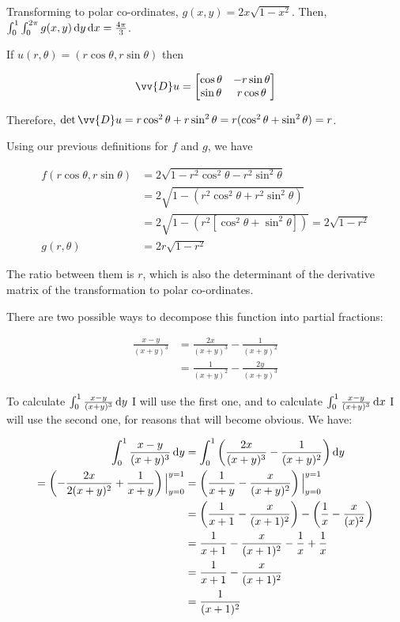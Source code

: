 Transforming to polar co-ordinates, $g(x, y) = 2x\sqrt{1 - x^2}$. Then, $\int_0^1 \int_0^{2\pi} g(x, y) \mathop{}\!\mathrm{d} y \mathop{}\!\mathrm{d} x = \frac{4\pi}{3}$.

If $u(r, \theta) = (r\cos\theta, r\sin\theta)$ then

$$
\vv{D}u =
\begin{bmatrix}
  \cos\theta & -r\sin\theta \\
  \sin\theta & r\cos\theta
\end{bmatrix}
$$

Therefore, $\detm \vv{D}u = r\cos^2\theta + r\sin^2\theta = r(\cos^2\theta + \sin^2\theta) = r$.

Using our previous definitions for $f$ and $g$, we have

\begin{align*}
  f(r\cos\theta, r\sin\theta) &= 2\sqrt{1 - r^2\cos^2\theta - r^2\sin^2\theta} \\
  &= 2\sqrt{1 - (r^2\cos^2\theta + r^2\sin^2\theta)} \\
  &= 2\sqrt{1 - (r^2[\cos^2\theta + \sin^2\theta])}  = 2\sqrt{1 - r^2} \\
  g(r, \theta) &= 2r\sqrt{1 - r^2}
\end{align*}

The ratio between them is $r$, which is also the determinant of the derivative matrix of the transformation to polar co-ordinates.

There are two possible ways to decompose this function into partial fractions:

\begin{align*}
  \frac{x - y}{(x + y)^3} &= \frac{2x}{(x + y)^3} - \frac{1}{(x + y)^2} \\
  &= \frac{1}{(x + y)^2} - \frac{2y}{(x + y)^3}
\end{align*}

To calculate $\int_0^1 \frac{x - y}{(x + y)^3} \mathop{}\!\mathrm{d} y$ I will use the first one, and to calculate $\int_0^1 \frac{x - y}{(x + y)^3} \mathop{}\!\mathrm{d} x$ I will use the second one, for reasons that will become obvious. We have:

\begin{align*}
  \int_0^1 \frac{x - y}{(x + y)^3} \mathop{}\!\mathrm{d} y &= \int_0^1 \left(\frac{2x}{(x + y)^3} - \frac{1}{(x + y)^2}\right) \mathop{}\!\mathrm{d} y \\
  = \left(-\frac{2x}{2(x + y)^2} + \frac{1}{x + y}\right)\Big|_{y = 0}^{y = 1} &= \left(\frac{1}{x + y} - \frac{x}{(x + y)^2}\right)\Big|_{y = 0}^{y = 1} \\
  &= \left(\frac{1}{x + 1} - \frac{x}{(x + 1)^2}\right) - \left(\frac{1}{x} - \frac{x}{(x)^2}\right) \\
  &= \frac{1}{x + 1} - \frac{x}{(x + 1)^2} - \frac{1}{x} + \frac{1}{x} \\
  &= \frac{1}{x + 1} - \frac{x}{(x + 1)^2} \\
  &= \frac{1}{(x + 1)^2}
\end{align*}

